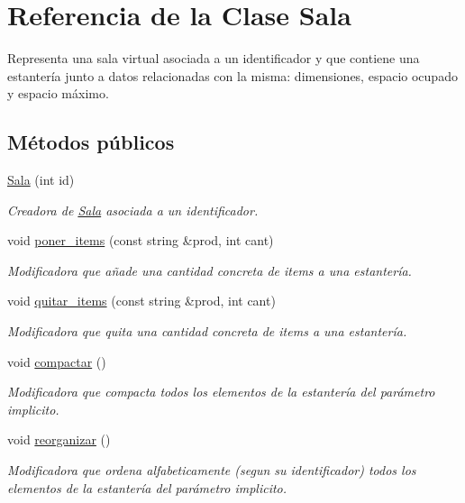\hypertarget{class_sala}{}\section{Referencia de la Clase Sala}
\label{class_sala}


Representa una sala virtual asociada a un identificador y que contiene una estantería junto a datos relacionadas con la misma\+: dimensiones, espacio ocupado y espacio máximo.  


\subsection*{Métodos públicos}
\begin{DoxyCompactItemize}
\item 
\hyperlink{class_sala_ab6f672b31658edd49b5d409bf9fbe659}{Sala} (int id)
\begin{DoxyCompactList}\small\item\em Creadora de \hyperlink{class_sala}{Sala} asociada a un identificador. \end{DoxyCompactList}\item 
void \hyperlink{class_sala_a748f6e7dd49a9c5f67623640f774e0ff}{poner\+\_\+items} (const string \&prod, int cant)
\begin{DoxyCompactList}\small\item\em Modificadora que añade una cantidad concreta de items a una estantería. \end{DoxyCompactList}\item 
void \hyperlink{class_sala_a4e449719446b07b4626c8502a87a5af2}{quitar\+\_\+items} (const string \&prod, int cant)
\begin{DoxyCompactList}\small\item\em Modificadora que quita una cantidad concreta de items a una estantería. \end{DoxyCompactList}\item 
void \hyperlink{class_sala_aac11486a22560bdcdb7771e9692cfa75}{compactar} ()
\begin{DoxyCompactList}\small\item\em Modificadora que compacta todos los elementos de la estantería del parámetro implicito. \end{DoxyCompactList}\item 
void \hyperlink{class_sala_aaac8d848595b493ea08516f2101b829e}{reorganizar} ()
\begin{DoxyCompactList}\small\item\em Modificadora que ordena alfabeticamente (segun su identificador) todos los elementos de la estantería del parámetro implicito. \end{DoxyCompactList}\item 

\end{DoxyCompactItemize}
